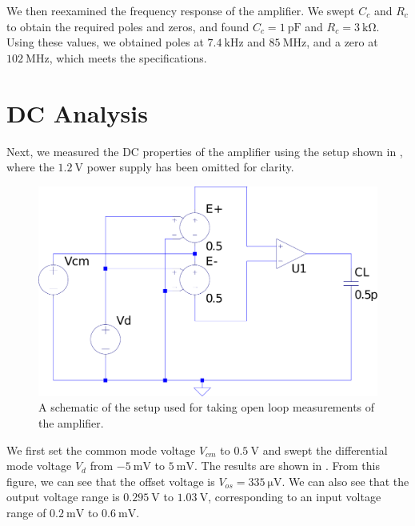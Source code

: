 \documentclass[journal,hidelinks]{IEEEtran}
\begin{document}
We then reexamined the frequency response of the amplifier. We swept $C_c$ and $R_c$ to obtain the required poles and zeros, and found $C_c = \SI{1}{\pico\farad}$ and $R_c = \SI{3}{\kilo\ohm}$. Using these values, we obtained poles at $\SI{7.4}{\kilo\hertz}$ and $\SI{85}{\mega\hertz}$, and a zero at $\SI{102}{\mega\hertz}$, which meets the specifications.

\section{DC Analysis}

Next, we measured the DC properties of the amplifier using the setup shown in , where the $\SI{1.2}{\volt}$ power supply has been omitted for clarity.

\begin{figure}[!htb]
  \centering
  \includegraphics[width=\columnwidth]{schematics/open-loop-setup.pdf}
  \caption{A schematic of the setup used for taking open loop measurements of the amplifier.}
  \label{fig:open-loop-setup}
\end{figure}

We first set the common mode voltage $V_{cm}$ to $\SI{0.5}{\volt}$ and swept the differential mode voltage $V_d$ from $\SI{-5}{\milli\volt}$ to $\SI{5}{\milli\volt}$. The results are shown in . From this figure, we can see that the offset voltage is $V_{os} = \SI{335}{\micro\volt}$. We can also see that the output voltage range is $\SI{0.295}{\volt}$ to $\SI{1.03}{\volt}$, corresponding to an input voltage range of $\SI{0.2}{\milli\volt}$ to $\SI{0.6}{\milli\volt}$.
\end{document}
